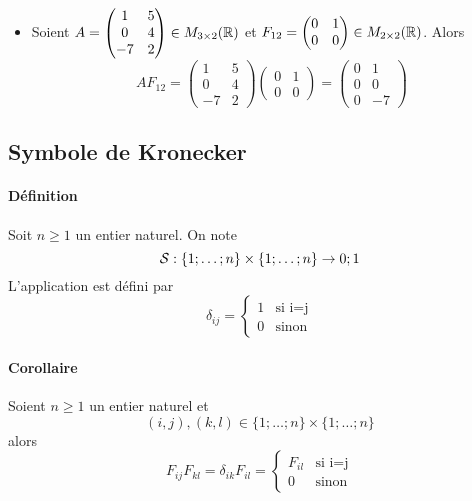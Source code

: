 \begin{itemize}
  \item Soient $A = \begin{pmatrix} 1 & 5 \\ 0 & 4 \\ -7 & 2 \end{pmatrix} \in  M_{3 \times 2}(\mathbb{R})$  et $F_{1 2} = \begin{pmatrix} 0 & 1 \\ 0 & 0 \end{pmatrix} \in M_{2 \times 2}(\mathbb{R})$. Alors
    $$A F_{1 2} 
      = \begin{pmatrix} 1 & 5 \\ 0 & 4 \\ -7 & 2 \end{pmatrix} \begin{pmatrix} 0 & 1 \\ 0 & 0 \end{pmatrix} 
      =\begin{pmatrix} 0 & 1 \\ 0 & 0 \\ 0 & -7 \end{pmatrix}$$
\end{itemize}

%
\subsection{Symbole de Kronecker}
%
\paragraph{Définition} Soit $n \geq 1$ un entier naturel. On note
$$\mathcal{S}: \{1; \ldots; n\}\times\{1; \ldots; n \} \rightarrow {0; 1}$$
L'application est défini par
$$\delta_{ij} = \left\{\begin{array}{lr} 1 & \text{si i=j} \\ 0 & \text{sinon} \end{array} \right.$$ 

\paragraph{Corollaire} Soient $n \geq 1$ un entier naturel et
$$(i, j), (k, l) \in \{1; \ldots; n\}\times\{1; \ldots; n\}$$
alors
$$F_{ij}F_{kl} = \delta_{ik} F_{il} = 
  \left\{\begin{array}{lr} F_{il} & \text{si i=j} \\ 0 & \text{sinon} \end{array} \right.$$

